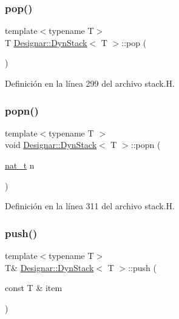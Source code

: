 \subsubsection{\texorpdfstring{pop()}{pop()}}
{\footnotesize\ttfamily template$<$typename T$>$ \\
T \hyperlink{class_designar_1_1_dyn_stack}{Designar\+::\+Dyn\+Stack}$<$ T $>$\+::pop (\begin{DoxyParamCaption}{ }\end{DoxyParamCaption})\hspace{0.3cm}{\ttfamily [inline]}}



Definición en la línea 299 del archivo stack.\+H.

\mbox{\label{class_designar_1_1_dyn_stack_a161b319e52448a4f824b036a9f7c6cca}} 
\subsubsection{\texorpdfstring{popn()}{popn()}}
{\footnotesize\ttfamily template$<$typename T $>$ \\
void \hyperlink{class_designar_1_1_dyn_stack}{Designar\+::\+Dyn\+Stack}$<$ T $>$\+::popn (\begin{DoxyParamCaption}\item[{\hyperlink{namespace_designar_aa72662848b9f4815e7bf31a7cf3e33d1}{nat\+\_\+t}}]{n }\end{DoxyParamCaption})}



Definición en la línea 311 del archivo stack.\+H.

\mbox{\label{class_designar_1_1_dyn_stack_a07d7d76d087e7b9dc287a7b2acd02fc6}} 
\subsubsection{\texorpdfstring{push()}{push()}\hspace{0.1cm}{\footnotesize\ttfamily [1/2]}}
{\footnotesize\ttfamily template$<$typename T$>$ \\
T\& \hyperlink{class_designar_1_1_dyn_stack}{Designar\+::\+Dyn\+Stack}$<$ T $>$\+::push (\begin{DoxyParamCaption}\item[{const T \&}]{item }\end{DoxyParamCaption})\hspace{0.3cm}{\ttfamily [inline]}}



